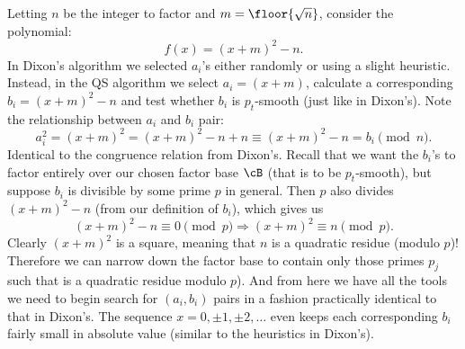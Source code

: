 \documentclass{report}
\begin{document}
Letting $n$ be the integer to factor and $m=\floor{\sqrt n}$, consider the polynomial:
\begin{equation}
    f(x)=(x+m)^2-n.
\end{equation}
In Dixon's algorithm we selected $a_i$'s either randomly or using a slight
heuristic. Instead, in the QS algorithm we select $a_i=(x+m)$, calculate a corresponding
$b_i=(x+m)^2-n$ and test whether $b_i$ is $p_t$-smooth (just like in Dixon's).
Note the relationship between $a_i$ and $b_i$ pair:
\begin{equation}
    a_i^2
    = (x+m)^2
    = (x+m)^2 - n + n
    \equiv (x+m)^2 - n
    = b_i \pmod n.
\end{equation}
Identical to the congruence relation from Dixon's.
Recall that we want the $b_i$'s to factor entirely over our chosen factor base $\cB$ (that is to be
$p_t$-smooth), but suppose $b_i$ is divisible by some prime $p$ in general. Then $p$ also divides
$(x+m)^2-n$ (from our definition of $b_i$), which gives us
\begin{equation}
    (x+m)^2 - n \equiv 0 \pmod p \Rightarrow
    (x+m)^2 \equiv n \pmod p.
\end{equation}
Clearly $(x+m)^2$ is a square, meaning that $n$ is a quadratic residue (modulo $p$)!
Therefore we can narrow down the factor base to contain only those primes $p_j$ such that
is a quadratic residue modulo $p$).
And from here we have all the tools we need to begin search for $(a_i,b_i)$ pairs in a fashion
practically identical to that in Dixon's. The sequence $x=0,\pm 1,\pm 2,\ldots$ even keeps each
corresponding $b_i$ fairly small in absolute value (similar to the heuristics in Dixon's).
\end{document}
